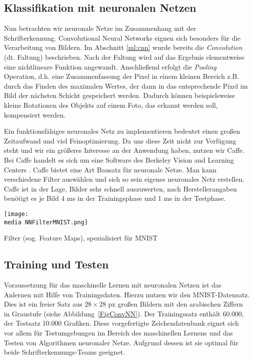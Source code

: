 \subsection{Klassifikation mit neuronalen Netzen}
Nun betrachten wir neuronale Netze im Zusammenhang mit der Schrifterkennung. Convolutional Neural Networks eignen sich besonders für die Verarbeitung von Bildern. 
Im Abschnitt \ref{ml:cnn} wurde bereits die \emph{Convolution} (dt. Faltung) beschrieben. 
Nach der Faltung wird auf das Ergebnis elementweise eine nichtlineare Funktion angewandt. Anschlie\ss end erfolgt die \emph{Pooling} Operation, d.h. eine Zusammenfassung der Pixel in einem kleinen Bereich z.B. durch das Finden des maximalen Wertes, der dann in das entsprechende Pixel im Bild der n\"achsten Schicht gespeichert werden. Dadurch können beispielsweise kleine Rotationen des Objekts auf einem Foto, das erkannt werden soll, kompensiert werden.

Ein funktionsfähiges neuronales Netz zu implementieren bedeutet einen großen Zeitaufwand und viel Feinoptimierung. Da uns diese Zeit nicht zur Verfügung steht und wir ein größeres Interesse an der Anwendung haben, nutzen wir Caffe. Bei Caffe handelt es sich um eine Software des Berkeley Vision and Learning Centers \cite{Caffe06}. Caffe bietet eine Art Bausatz für neuronale Netze. Man kann verschiedene Filter auswählen und sich so sein eigenes neuronales Netz erstellen. Caffe ist in der Lage, Bilder sehr schnell auszuwerten, nach Herstellerangaben benötigt es je Bild 4 ms in der Trainingsphase und 1 ms in der Testphase.


\begin{dsafigure}
\begin{center}
	\texttt{[image: \\media NNFilterMNIST.png]}
	\caption{Filter (sog. Feature Maps), spezialisiert für MNIST}
	\label{NNFilterMNIST}
\end{center}
\end{dsafigure}



\subsection{Training und Testen}
Voraussetzung für das maschinelle Lernen mit neuronalen Netzen ist das Anlernen mit Hilfe von Trainingsdaten. Hierzu nutzen wir den MNIST-Datensatz. Dies ist ein freier Satz aus $28 \times 28$ px großen Bildern mit den arabischen Ziffern in Graustufe (siehe Abbildung~\ref{FigConvNN}). Der Trainingssatz enthält 60.000, der Testsatz 10.000 Grafiken. Diese vorgefertigte Zeichendatenbank eignet sich vor allem für Testumgebungen im Bereich des maschinellen Lernens und das Testen von Algorithmen neuronaler Netze. Aufgrund dessen ist sie optimal für beide Schrifterkennungs-Teams geeignet.

